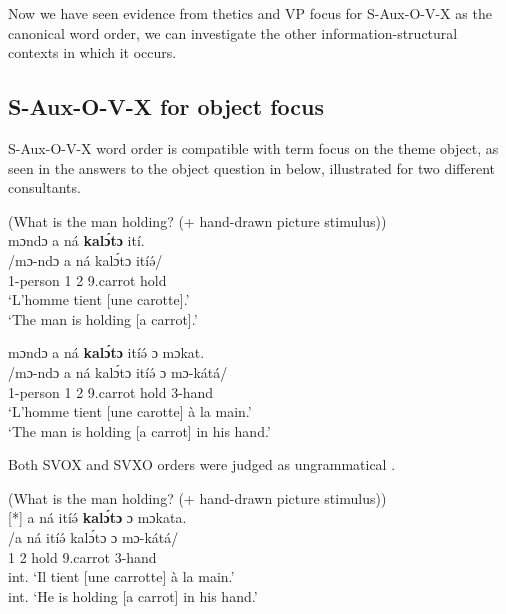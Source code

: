 \documentclass[output=paper,colorlinks,citecolor=brown
]{langscibook}
\begin{document}
\z

Now we have seen evidence from thetics and VP focus for S-Aux-O-V-X as the canonical word order, we can investigate the other information-structural contexts in which it occurs.

\subsection{S-Aux-O-V-X for object focus}

S-Aux-O-V-X word order is compatible with term focus on the theme object, as seen in the  answers to the object question in  below, illustrated for two different consultants.

\ea \label{carrotobj} (What is the man holding? (+ hand-drawn picture stimulus)) \\
\ea
\glll
{\db}mɔndɔ a ná \textbf{kalɔ́tɔ} ití. \\
/mɔ-ndɔ a ná kalɔ́tɔ itíə́/ \\
{\db}1-person 1\SM{} \PST{}2{} 9.carrot hold \\
\glt
`L'homme tient [une carotte]\textsubscript{\FOC{}}.' \\ `The man is holding [a carrot]\textsubscript{\FOC{}}.' \jambox*{[JO 1107] }

\ex
\glll
{\db}mɔndɔ a ná \textbf{kalɔ́tɔ} itíə́ ɔ mɔkat.  \\
/mɔ-ndɔ a ná kalɔ́tɔ itíə́ ɔ mɔ-kátá/ \\
{\db}1-person 1\SM{} \PST{}2{} 9.carrot hold \PREP{} 3-hand \\
\glt
`L'homme tient [une carotte]\textsubscript{\FOC{}} à la main.' \\ `The man is holding [a carrot]\textsubscript{\FOC{}} in his hand.' \jambox*{[PM 1264] }

\z
\z

Both SVOX and SVXO orders were judged as ungrammatical .

\ea  (What is the man holding? (+ hand-drawn picture stimulus)) \\ 
\ea
[*]{
\label{carrotobjsvox}
\glll
{\db}a ná itíə́ \textbf{kalɔ́tɔ} ɔ mɔkata. \\
/a ná itíə́ kalɔ́tɔ ɔ mɔ-kátá/ \\
{\db}1\SM{} \PST{}2{} hold 9.carrot \PREP{} 3-hand \\
\glt
int. `Il tient [une carrotte]\textsubscript{\FOC{}} à la main.' \\ int. `He is holding [a carrot]\textsubscript{\FOC{}} in his hand.' \jambox*{[JO 1626] }
}
\end{document}
